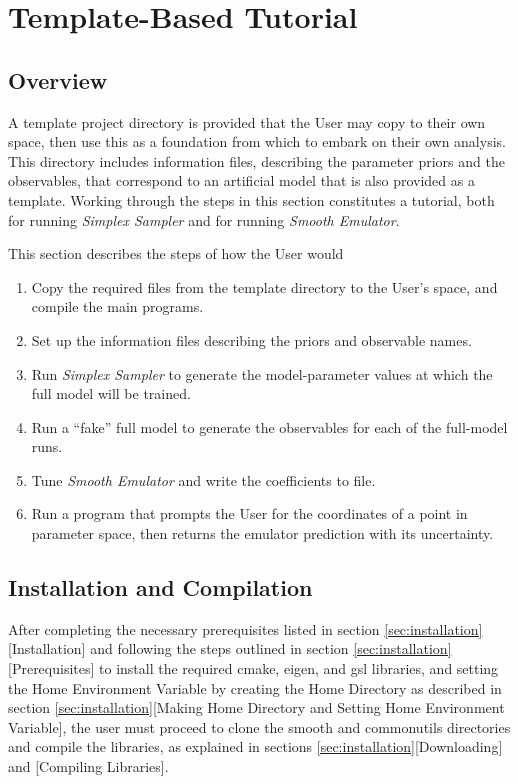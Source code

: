 \documentclass[UserManual.tex]{subfiles}
\begin{document}
\setcounter{section}{7}
\section{Template-Based Tutorial}\label{sec:tutorial}

\subsection{Overview}
A template project directory is provided that the User may copy to their own space, then use this as a foundation from which to embark on their own analysis. This directory includes information files, describing the parameter priors and the observables, that correspond to an artificial model that is also provided as a template. Working through the steps in this section constitutes a tutorial, both for running {\it Simplex Sampler} and for running {\it Smooth Emulator}.

This section describes the steps of how the User would
\begin{enumerate}\itemsep=0pt
\item Copy the required files from the template directory to the User's space, and compile the main programs.
\item Set up the information files describing the priors and observable names.
\item Run {\it Simplex Sampler} to generate the model-parameter values at which the full model will be trained.
\item Run a ``fake'' full model to generate the observables for each of the full-model runs.
\item Tune {\it Smooth Emulator} and write the coefficients to file.
\item Run a program that prompts the User for the coordinates of a point in parameter space, then returns the emulator prediction with its uncertainty.
\end{enumerate}

\subsection{Installation and Compilation}
After completing the necessary prerequisites listed in section \ref{sec:installation}[Installation] and following the steps outlined in section \ref{sec:installation}[Prerequisites] to install the required cmake, eigen, and gsl libraries, and setting the Home Environment Variable by creating the Home Directory as described in section \ref{sec:installation}[Making Home Directory and Setting Home Environment Variable], the user must proceed to clone the smooth and commonutils directories and compile the libraries, as explained in sections \ref{sec:installation}[Downloading] and [Compiling Libraries].
\end{document}
